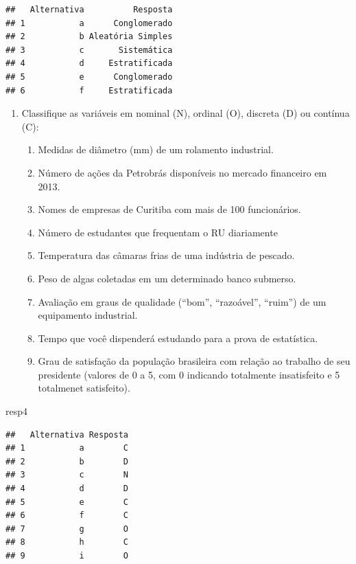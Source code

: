 \documentclass[]{article}
\newenvironment{Shaded}{\begin{snugshade}}{\end{snugshade}}
\newcommand{\NormalTok}[1]{#1}
\providecommand{\tightlist}{%
  \setlength{\itemsep}{0pt}\setlength{\parskip}{0pt}}
\begin{document}
\begin{verbatim}
##   Alternativa          Resposta
## 1           a      Conglomerado
## 2           b Aleatória Simples
## 3           c       Sistemática
## 4           d     Estratificada
## 5           e      Conglomerado
## 6           f     Estratificada
\end{verbatim}

\begin{enumerate}
\def\labelenumi{\arabic{enumi}.}
\setcounter{enumi}{3}
\tightlist
\item
  Classifique as variáveis em nominal (N), ordinal (O), discreta (D) ou
  contínua (C):

  \begin{enumerate}
  \def\labelenumii{(\alph{enumii})}
  \tightlist
  \item
    Medidas de diâmetro (mm) de um rolamento industrial.
  \item
    Número de ações da Petrobrás disponíveis no mercado financeiro em
    2013.
  \item
    Nomes de empresas de Curitiba com mais de 100 funcionários.
  \item
    Número de estudantes que frequentam o RU diariamente
  \item
    Temperatura das câmaras frias de uma indústria de pescado.
  \item
    Peso de algas coletadas em um determinado banco submerso.
  \item
    Avaliação em graus de qualidade (``bom'', ``razoável'', ``ruim'') de
    um equipamento industrial.
  \item
    Tempo que você dispenderá estudando para a prova de estatística.
  \item
    Grau de satisfação da população brasileira com relação ao trabalho
    de seu presidente (valores de 0 a 5, com 0 indicando totalmente
    insatisfeito e 5 totalmenet satisfeito).
  \end{enumerate}
\end{enumerate}

\begin{Shaded}
\begin{Highlighting}[]
\NormalTok{resp4}
\end{Highlighting}
\end{Shaded}

\begin{verbatim}
##   Alternativa Resposta
## 1           a        C
## 2           b        D
## 3           c        N
## 4           d        D
## 5           e        C
## 6           f        C
## 7           g        O
## 8           h        C
## 9           i        O
\end{verbatim}
\end{document}
